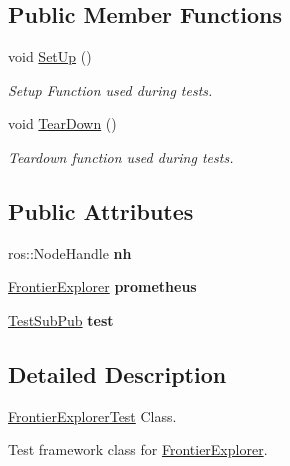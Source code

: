 \subsection*{Public Member Functions}
\begin{DoxyCompactItemize}
\item 
void \hyperlink{classFrontierExplorerTest_a1471f30c1ded451b221c75dc7f8d18df}{Set\+Up} ()
\begin{DoxyCompactList}\small\item\em Setup Function used during tests. \end{DoxyCompactList}\item 
void \hyperlink{classFrontierExplorerTest_a7243e2b27064fbeedf27b65095a92e0a}{Tear\+Down} ()
\begin{DoxyCompactList}\small\item\em Teardown function used during tests. \end{DoxyCompactList}\end{DoxyCompactItemize}
\subsection*{Public Attributes}
\begin{DoxyCompactItemize}
\item 
ros\+::\+Node\+Handle {\bfseries nh}\hypertarget{classFrontierExplorerTest_a8c67a93eb7d215be22f24278e166ed69}{}\label{classFrontierExplorerTest_a8c67a93eb7d215be22f24278e166ed69}

\item 
\hyperlink{classFrontierExplorer}{Frontier\+Explorer} {\bfseries prometheus}\hypertarget{classFrontierExplorerTest_a0e28413e4df17dee970a008c6eaa13da}{}\label{classFrontierExplorerTest_a0e28413e4df17dee970a008c6eaa13da}

\item 
\hyperlink{classTestSubPub}{Test\+Sub\+Pub} {\bfseries test}\hypertarget{classFrontierExplorerTest_a52eef52386379d9353428c647af2cd98}{}\label{classFrontierExplorerTest_a52eef52386379d9353428c647af2cd98}

\end{DoxyCompactItemize}


\subsection{Detailed Description}
\hyperlink{classFrontierExplorerTest}{Frontier\+Explorer\+Test} Class. 

Test framework class for \hyperlink{classFrontierExplorer}{Frontier\+Explorer}. 

